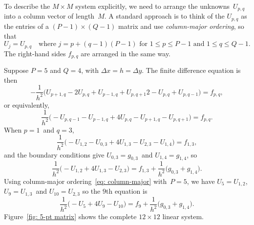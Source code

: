 To describe the $M\times M$ system explicitly, we need to arrange the 
unknowns~$U_{p,q}$ into a column vector of length~$M$.  A standard approach is 
to think of the $U_{p,q}$ as the entries of a $(P-1)\times(Q-1)$ matrix and use 
\emph{column-major ordering}, so that
\begin{equation}\label{eq: column-major}
U_j=U_{p,q}\quad
\text{where $j=p+(q-1)(P-1)$ for $1\le p\le P-1$ and $1\le q\le Q-1$.}
\end{equation}
The right-hand sides $f_{p,q}$ are arranged in the same way.  

\begin{example}\label{example: 5-pt matrix}
Suppose $P=5$ and $Q=4$, with $\Delta x=h=\Delta y$.  The finite difference 
equation is then
\[
-\frac{1}{h^2}\bigl(U_{p+1,q}-2U_{p,q}+U_{p-1,q}+U_{p,q+1}2-U_{p,q}+U_{p,q-1}
    \bigr)=f_{p,q},
\]
or equivalently,
\[
\frac{1}{h^2}\bigl(-U_{p,q-1}-U_{p-1,q}+4U_{p,q}-U_{p+1,q}-U_{p,q+1}\bigr)
    =f_{p,q}.
\]
When $p=1$~and $q=3$,
\[
\frac{1}{h^2}\bigl(-U_{1,2}-U_{0,3}+4U_{1,3}-U_{2,3}-U_{1,4}\bigr)
    =f_{1,3},
\]
and the boundary conditions give $U_{0,3}=g_{0,3}$~and $U_{1,4}=g_{1,4}$, so
\[
\frac{1}{h^2}\bigl(-U_{1,2}+4U_{1,3}-U_{2,3}\bigr)
    =f_{1,3}+\frac{1}{h^2}\bigl(g_{0,3}+g_{1,4}\bigr).
\]
Using column-major ordering~\eqref{eq: column-major} with~$P=5$, we have
$U_5=U_{1,2}$, $U_9=U_{1,3}$~and $U_{10}=U_{2,3}$ so the $9$th equation is
\[
\frac{1}{h^2}\bigl(-U_5+4U_9-U_{10}\bigr)=f_9
    +\frac{1}{h^2}\bigl(g_{0,3}+g_{1,4}\bigr).
\]
Figure~\ref{fig: 5-pt matrix} shows the complete $12\times12$ linear system.
\end{example}

